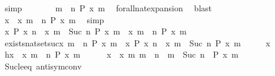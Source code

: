\begin{isabellebody}
\ simp\isanewline
\ \ \ \ \isamarkupfalse%
\ \isamarkupfalse%
\ {\isacartoucheopen}{\isasymforall}m\ {\isasymge}\ n{\isachardot}\ P\ x\ m{\isacartoucheclose}\ \isamarkupfalse%
\ forall{\isacharunderscore}nat{\isacharunderscore}expansion\ \isamarkupfalse%
\ blast\isanewline
\ \ \ \ \isamarkupfalse%
\ {\isacartoucheopen}x\ {\isasymin}\ {\isacharbraceleft}x{\isachardot}\ {\isasymforall}m\ {\isasymge}\ n{\isachardot}\ P\ x\ m{\isacharbraceright}{\isacartoucheclose}\ \isamarkupfalse%
\ simp\isanewline
\ \ \isacommand{{\isacharbraceright}}\isamarkupfalse%
\ \isamarkupfalse%
\ {\isacartoucheopen}{\isacharbraceleft}x{\isachardot}\ P\ x\ n{\isacharbraceright}\ {\isasyminter}\ {\isacharbraceleft}x{\isachardot}\ {\isasymforall}m\ {\isasymge}\ Suc\ n{\isachardot}\ P\ x\ m{\isacharbraceright}\ {\isasymsubseteq}\ {\isacharbraceleft}x{\isachardot}\ {\isasymforall}m\ {\isasymge}\ n{\isachardot}\ P\ x\ m{\isacharbraceright}{\isacartoucheclose}\ \isacommand{{\isachardot}{\isachardot}}\isamarkupfalse%
\isanewline
{}\isamarkupfalse%
%
\endisatagproof
{\isafoldproof}%
%
\isadelimproof
\isanewline
%
\endisadelimproof
\isanewline
{}\isamarkupfalse%
\ exists{\isacharunderscore}nat{\isacharunderscore}set{\isacharunderscore}suc{\isacharcolon}{\isacartoucheopen}{\isacharbraceleft}x{\isachardot}\ {\isasymexists}m\ {\isasymge}\ n{\isachardot}\ P\ x\ m{\isacharbraceright}\ {\isacharequal}\ {\isacharbraceleft}x{\isachardot}\ P\ x\ n{\isacharbraceright}\ {\isasymunion}\ {\isacharbraceleft}x{\isachardot}\ {\isasymexists}m\ {\isasymge}\ Suc\ n{\isachardot}\ P\ x\ m{\isacharbraceright}{\isacartoucheclose}\isanewline
%
\isadelimproof
%
\endisadelimproof
%
\isatagproof
{}\isamarkupfalse%
\isanewline
\ \ \isacommand{{\isacharbraceleft}}\isamarkupfalse%
\ \isamarkupfalse%
\ x\ \isamarkupfalse%
\ h{\isacharcolon}{\isacartoucheopen}x\ {\isasymin}\ {\isacharbraceleft}x{\isachardot}\ {\isasymexists}m\ {\isasymge}\ n{\isachardot}\ P\ x\ m{\isacharbraceright}{\isacartoucheclose}\isanewline
\ \ \ \ \isamarkupfalse%
\ {\isacartoucheopen}x\ {\isasymin}\ {\isacharbraceleft}x{\isachardot}\ {\isasymexists}m{\isachardot}\ {\isacharparenleft}m\ {\isacharequal}\ n\ {\isasymor}\ m\ {\isasymge}\ Suc\ n{\isacharparenright}\ {\isasymand}\ P\ x\ m{\isacharbraceright}{\isacartoucheclose}\isanewline
\ \ \ \ \ \ \isamarkupfalse%
\ Suc{\isacharunderscore}le{\isacharunderscore}eq\ antisym{\isacharunderscore}conv{}\ \isamarkupfalse%

\end{isabellebody}
